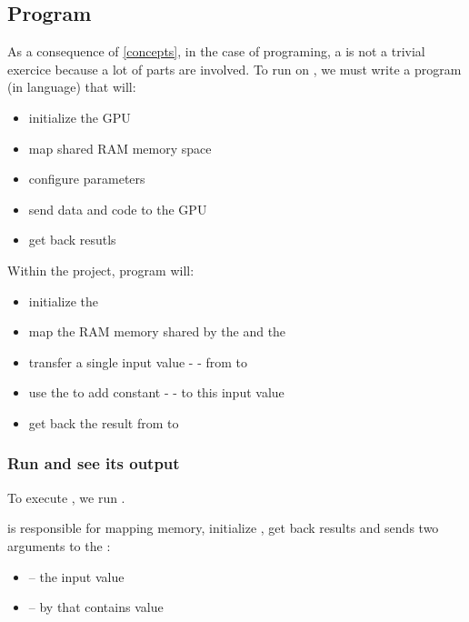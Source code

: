 \subsection{ Program}

As a consequence of \ref{concepts}, in the case of  programing, a  is not a trivial exercice because a lot of parts are involved. To run  on \vc, we must write a \cpu{} program (in  language) that will:
\begin{itemize}
	\item initialize the GPU
	\item map shared RAM memory space
	\item configure parameters
	\item send data and code to the GPU
	\item get back resutls
\end{itemize}
\vspace{10 mm}

Within the  project,  program will:

\begin{itemize}
	\item initialize the \vc
	\item map the RAM memory shared by the \vc{} and the \cpu
	\item transfer a single input value -  - from \cpu{} to \vc
	\item use the \vc{} to add constant  -  - to this input value
	\item get back the result from \vc{} to \cpu
\end{itemize}


\subsubsection{Run  and see its output}

To execute , we run .

 is responsible for mapping memory, initialize , get back results and sends two arguments to the :
\begin{itemize}
	\item {} -- the input value
	\item {} --  by \vc{} that contains  value
\end{itemize}

